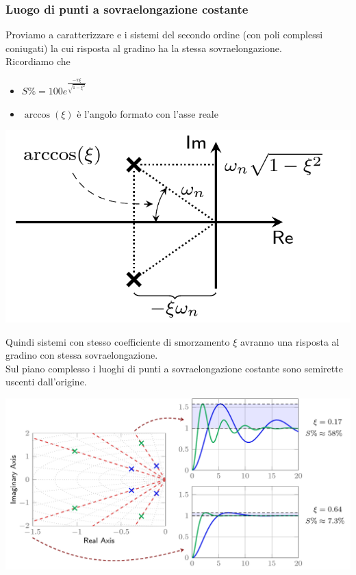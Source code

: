 \documentclass{article}
\numberwithin{equation}{subsection}
\begin{document}
\subsubsection{Luogo di punti a sovraelongazione costante}
Proviamo a caratterizzare e i sistemi del secondo ordine (con poli complessi coniugati) la cui risposta al gradino ha la stessa sovraelongazione.
\vspace*{0.1cm}\\
Ricordiamo che 
\begin{itemize}
    \item $S\% = 100 e^{\frac{-\pi \xi}{\sqrt{1-\xi^2}}}$
    \item $\arccos(\xi)$ è l'angolo formato con l'asse reale
\end{itemize}
\begin{center}
    \includegraphics[scale=0.23]{Images/Secondo_ordine_poli_complessi.png}
\end{center}
Quindi sistemi con stesso coefficiente di smorzamento $\xi$ avranno una risposta al gradino con stessa sovraelongazione.
\vspace*{0.1cm}\\
Sul piano complesso i luoghi di punti a sovraelongazione costante sono semirette uscenti dall'origine.
\begin{center}
    \includegraphics[scale=0.23]{Images/Sovraelongazione_costante.png}
\end{center}
\end{document}
